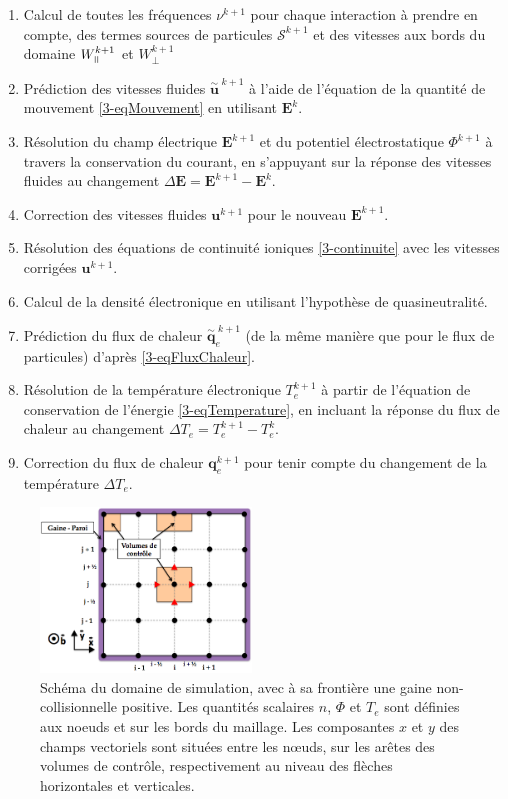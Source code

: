 \begin{refsection}
\begin{enumerate}
  \item Calcul de toutes les fréquences $\nu^{k+1}$ pour
  chaque interaction à prendre en compte, des termes sources de particules
  $\mathcal{S}^{k+1}$ et des vitesses aux bords du domaine $W_{\para}^{k+1}$ et
  $W_{\perp}^{k+1}$
  \item Prédiction des vitesses fluides ${\overset{\sim}{\mathbf u}}^{\;k+1}$ à
  l'aide de l'équation de la quantité de mouvement \eqref{3-eqMouvement} en
  utilisant $\mathbf E^{k}$.
  \item Résolution du champ électrique $\mathbf E^{k+1}$ et du potentiel
  électrostatique $\Phi^{k+1}$ à travers la conservation du courant, en
  s'appuyant sur la réponse des vitesses fluides au changement $\Delta \mathbf
  E=\mathbf E^{k+1}-\mathbf E^{k}$.
  \item Correction des vitesses fluides $\mathbf u^{k+1}$ pour le nouveau
  $\mathbf E^{k+1}$.
  \item Résolution des équations de continuité ioniques \eqref{3-continuite} avec les
  vitesses corrigées $\mathbf u^{k+1}$.
  \item Calcul de la densité électronique en utilisant l'hypothèse de
  quasineutralité.
  \item Prédiction du flux de chaleur ${\overset{\sim}{\mathbf q}}_e^{\;k+1}$
  (de la même manière que pour le flux de particules) d'après
  \eqref{3-eqFluxChaleur}.
  \item Résolution de la température électronique $T_e^{k+1}$ à partir de
  l'équation de conservation de l'énergie \eqref{3-eqTemperature}, en incluant la réponse du flux de
  chaleur au changement $\Delta T_e=T_e^{k+1}-T_e^{k}$.
  \item Correction du flux de chaleur $\mathbf
  q_e^{k+1}$ pour tenir compte du changement de la température $\Delta T_e$.
\end{enumerate}

\begin{figure}[!htbp]
\centering
\includegraphics[width=0.5\textwidth]{figures/3-magnisGrid.png}
{\caption{Schéma du domaine de simulation, avec à sa frontière une gaine
non-collisionnelle positive.
Les quantités scalaires $n$, $\Phi$ et $T_e$ sont définies aux noeuds et sur les
bords du maillage. Les composantes $x$ et $y$ des champs vectoriels sont
situées entre les n\oe uds, sur les arêtes des volumes de contrôle,
respectivement au niveau des flèches horizontales et verticales.}
\label{3-maillage}}
\end{figure}


\end{refsection}
